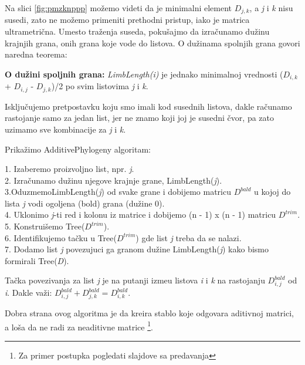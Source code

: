 Na slici \ref{fig:pmzknppp} mo\v{z}emo videti da je minimalni element $D_{j,k}$, a \textit{j} i \textit{k} nisu susedi, zato ne mo\v{z}emo primeniti prethodni pristup, iako je matrica ultrametri\v{c}na. Umesto tra\v{z}enja suseda, poku\v{s}ajmo da izra\v{c}unamo du\v{z}inu krajnjih grana, onih grana koje vode do listova. O du\v{z}inama spolnjih grana govori naredna teorema:

\begin{teorema}
\textbf{O du\v{z}ini spoljnih grana:} \textit{LimbLength(i)} je jednako minimalnoj vrednosti ($D_{i, k}$ + $D_{i, j}$ - $D_{j, k}$)/2 po svim listovima \textit{j} i \textit{k}.
\end{teorema}

Isklju\v{c}ujemo pretpostavku koju smo imali kod susednih listova, dakle ra\v{c}unamo rastojanje samo za jedan list, jer ne znamo koji joj je susedni \v{c}vor, pa zato uzimamo sve kombinacije za \textit{j} i \textit{k}. 

Prika\v{z}imo AdditivePhylogeny algoritam:

\begin{tcolorbox}
1. Izaberemo proizvoljno list, npr. \textit{j}. \\
2. Izra\v{c}unamo du\v{z}inu njegove krajnje grane, LimbLength(\textit{j}). \\
3.OduzmemoLimbLength(\textit{j}) od svake grane i dobijemo matricu \textit{$D^{bald}$}  u kojoj do lista \textit{j} vodi ogoljena (bold) grana (du\v{z}ine 0). \\
4. Uklonimo \textit{j}-ti red i kolonu iz matrice i dobijemo (n - 1) x (n - 1) matricu \textit{$D^{trim}$}. \\
5. Konstrui\v{s}emo Tree($D^{trim}$). \\
6. Identifikujemo ta\v{c}ku u Tree($D^{trim}$) gde list \textit{j} treba da se nalazi. \\
7. Dodamo list \textit{j} povezujuci ga granom du\v{z}ine LimbLength(\textit{j}) kako bismo formirali Tree(\textit{D}). 
\end{tcolorbox}

Ta\v{c}ka povezivanja za list \textit{j} je na putanji izme\dj u listova \textit{i} i \textit{k} na rastojanju $D^{bald}_{i, j}$ od \textit{i}. Dakle va\v{z}i: \textit{$D^{bald}_{i, j} + D^{bald}_{j, k} = D^{bald}_{i, k}$}.

Dobra strana ovog algoritma je da kreira stablo koje odgovara aditivnoj matrici, a lo\v{s}a da ne radi za neaditivne matrice \footnote{Za primer postupka pogledati slajdove sa predavanja}.
 
